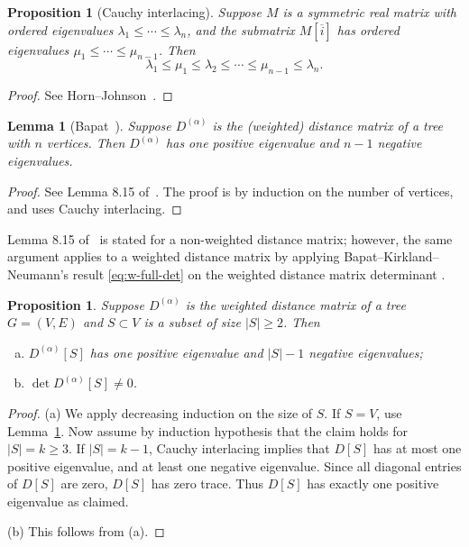 \documentclass{amsart}
\newtheorem{prop}[thm]{Proposition}
\newtheorem{lem}[thm]{Lemma}
\theoremstyle{definition}
\newcommand{\Da}{{D^{(\alpha)}}}
\begin{document}
\begin{prop}[Cauchy interlacing]
\label{prop:cauchy-interlacing}
Suppose $M$ is a symmetric real matrix 
with ordered eigenvalues $\lambda_1 \leq \cdots \leq \lambda_n$, 
and  the submatrix $M[\overline{i}]$ has ordered eigenvalues $\mu_1 \leq \cdots \leq \mu_{n-1}$.
Then
\[
	\lambda_1 \leq \mu_1 \leq \lambda_2 \leq \cdots \leq \mu_{n-1} \leq \lambda_n.
\]
\end{prop}
\begin{proof}
See Horn--Johnson~\cite[Theorem 4.3.17]{horn-johnson}.
\end{proof}

\begin{lem}[{Bapat~\cite[Lemma 8.15]{bapat}}]
\label{lem:dist-signature}
Suppose $\Da$ is the (weighted) distance matrix of a tree with $n$ vertices. 
Then $\Da$ has one positive eigenvalue and $n - 1$ negative eigenvalues.
\end{lem}
\begin{proof}
See Lemma 8.15 of~\cite{bapat}. The proof is by induction on the number of vertices, and uses Cauchy interlacing.
\end{proof}
Lemma 8.15 of~\cite{bapat} is stated for a non-weighted distance matrix;
however, the same argument applies to a weighted distance matrix by applying Bapat--Kirkland--Neumann's result \eqref{eq:w-full-det} on the weighted distance matrix determinant \cite[Corollary 2.5]{bapat-kirkland-neumann}. 

\begin{prop}
\label{prop:distance-sub-nonsingular}
Suppose $\Da$ is the weighted distance matrix of a tree $G = (V,E)$ and $S \subset V$ is a subset of size $|S| \geq 2$. 
Then
\begin{enumerate}[(a)]
\item $\Da[S]$ has one positive eigenvalue and $|S| - 1$ negative eigenvalues;

\item $\det \Da[S] \neq 0$.

\end{enumerate}
\end{prop}
\begin{proof}
(a) 
We apply decreasing induction on the size of $S$. 
If $S = V$, use Lemma~\ref{lem:dist-signature}.
Now assume by induction hypothesis that the claim holds for $|S| = k \geq 3$.
If $|S| = k - 1$, Cauchy interlacing implies that $D[S]$ has at most one positive eigenvalue, and at least one negative eigenvalue. 
Since all diagonal entries of $D[S]$ are zero, $D[S]$ has zero trace. 
Thus $D[S]$ has exactly one positive eigenvalue as claimed.

(b) This follows from (a).
\end{proof}
\end{document}
